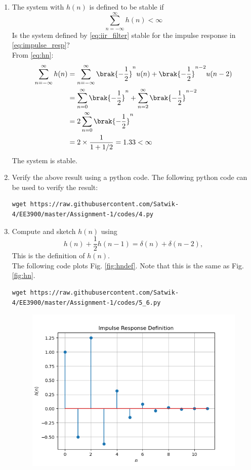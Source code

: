 \documentclass[journal,12pt,twocolumn]{IEEEtran}
\renewcommand\thesection{\arabic{section}}
\begin{document}
\begin{enumerate}[label=\thesection.\arabic*]
%
\item The system with $h(n)$ is defined to be stable if
\begin{equation}
\sum_{n=-\infty}^{\infty}h(n) < \infty
\end{equation}
Is the system defined by \eqref{eq:iir_filter} stable for the impulse response in \eqref{eq:impulse_resp}?
%
\\\solution
From \eqref{eq:hn}:
\begin{align}
    \sum_{n=-\infty}^{\infty} h(n) &= \sum_{n=-\infty}^{\infty}\brak{-\frac{1}{2}}^{n}u(n) + \brak{-\frac{1}{2}}^{n-2}u(n-2)\\
    &= \sum_{n=0}^{\infty}\brak{-\frac{1}{2}}^{n} + \sum_{n=2}^{\infty}\brak{-\frac{1}{2}}^{n-2}\\
    &= 2\sum_{n=0}^{\infty}\brak{-\frac{1}{2}}^{n}\\
    &= 2\times\frac{1}{1+1/2}
    = 1.33 < \infty
\end{align}
The system is stable.
\item Verify the above result using a python code.
\solution The following python code can be used to verify the result:
\begin{lstlisting}
wget https://raw.githubusercontent.com/Satwik-4/EE3900/master/Assignment-1/codes/4.py
\end{lstlisting}
\item 
Compute and sketch $h(n)$ using 
\begin{equation}
\label{eq:iir_filter_h}
h(n) + \frac{1}{2}h(n-1) = \delta(n) + \delta(n-2), 
\end{equation}
%
This is the definition of $h(n)$.
\\
\solution The following code plots Fig. \ref{fig:hndef}. Note that this is the same as Fig. 
\ref{fig:hn}. 
%
\begin{lstlisting}
wget https://raw.githubusercontent.com/Satwik-4/EE3900/master/Assignment-1/codes/5_6.py
\end{lstlisting}
\begin{figure}[!ht]
\centering
\includegraphics[width=\columnwidth]{figures/Figure_4.png}

\end{figure}
\end{enumerate}
\end{document}
